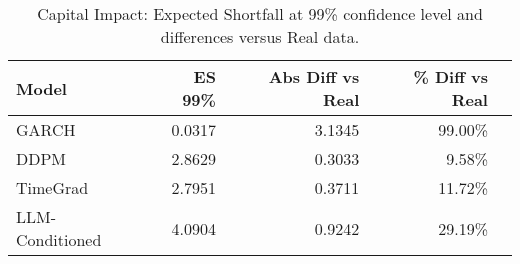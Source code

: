 \begin{table}[htbp]
\centering
\begin{tabular}{lrrrr}
\toprule
Model & ES 99\% & Abs Diff vs Real & \% Diff vs Real \\
\midrule
GARCH & 0.0317 & 3.1345 & 99.00\% \\
DDPM & 2.8629 & 0.3033 & 9.58\% \\
TimeGrad & 2.7951 & 0.3711 & 11.72\% \\
LLM-Conditioned & 4.0904 & 0.9242 & 29.19\% \\
\bottomrule
\end{tabular}
\caption{Capital Impact: Expected Shortfall at 99\% confidence level and differences versus Real data.}
\label{tab:capital_impact}
\end{table}